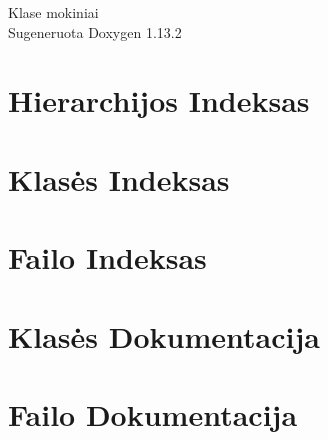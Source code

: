 \documentclass[twoside]{book}
\newcommand{\+}{\discretionary{\mbox{\scriptsize$\hookleftarrow$}}{}{}}
\newcommand{\clearemptydoublepage}{%
    \newpage{\pagestyle{empty}\cleardoublepage}%
  }
\begin{document}
  \raggedbottom
    \hypersetup{pageanchor=false,
                bookmarksnumbered=true,
                pdfencoding=unicode
               }
  \begin{titlepage}
  \vspace*{7cm}
  \begin{center}%
  {\Large Klase mokiniai}\\
  \vspace*{1cm}
  {\large Sugeneruota Doxygen 1.13.2}\\
  \end{center}
  \end{titlepage}
  \clearemptydoublepage
  \tableofcontents
  \clearemptydoublepage
  \hypersetup{pageanchor=true}

\chapter{Hierarchijos Indeksas}

\chapter{Klasės Indeksas}

\chapter{Failo Indeksas}

\chapter{Klasės Dokumentacija}



\chapter{Failo Dokumentacija}










  \backmatter
  \newpage
  \clearemptydoublepage
  \printindex
\end{document}

